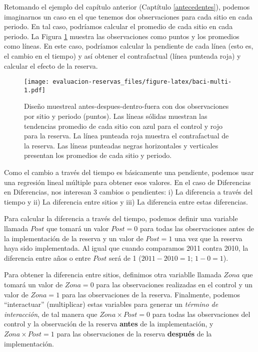 \documentclass[]{krantz}
\begin{document}
Retomando el ejemplo del capítulo anterior (Captítulo \ref{antecedentes}), podemos imaginarnos un caso en el que tenemos dos observaciones para cada sitio en cada periodo. En tal caso, podríamos calcular el promedio de cada sitio en cada periodo. La Figura \ref{fig:baci-multi} muestra las observaciones como puntos y los promedios como líneas. En este caso, podríamos calcular la pendiente de cada línea (esto es, el cambio en el tiempo) y así obtener el contrafactual (línea punteada roja) y calcular el efecto de la reserva.

\begin{figure}
\centering
\texttt{[image: evaluacion-reservas\_files/figure-latex/baci-multi-1.pdf]}
\caption{\label{fig:baci-multi}Diseño muestreal antes-despues-dentro-fuera con dos observaciones por sitio y periodo (puntos). Las líneas sólidas muestran las tendencias promedio de cada sitio con azul para el control y rojo para la reserva. La línea punteada roja muestra el contrafactual de la reserva. Las líneas punteadas negras horizontales y verticales presentan los promedios de cada sitio y periodo.}
\end{figure}

Como el cambio a través del tiempo es básicamente una pendiente, podemos usar una regresión lineal múltiple para obtener esos valores. En el caso de Diferencias en Diferencias, nos interesan 3 cambios o pendientes: i) La diferencia a través del tiempo y ii) La diferencia entre sitios y iii) La diferencia entre estas diferencias.

Para calcular la diferencia a través del tiempo, podemos definir una variable llamada \(Post\) que tomará un valor \(Post = 0\) para todas las observaciones antes de la implementación de la reserva y un valor de \(Post = 1\) una vez que la reserva haya sido implementada. Al igual que cuando comparamos 2011 contra 2010, la diferencia entre años o entre \(Post\) será de 1 (\(2011 - 2010 = 1\); \(1 - 0 = 1\)).

Para obtener la diferencia entre sitios, definimos otra variablle llamada \(Zona\) que tomará un valor de \(Zona = 0\) para las observaciones realizadas en el control y un valor de \(Zona = 1\) para las observaciones de la reserva. Finalmente, podemos ``interactuar'' (multiplicar) estas variables para generar un \emph{término de interacción}, de tal manera que \(Zona \times Post = 0\) para todas las observaciones del control y la observación de la reserva \textbf{antes} de la implementación, y \(Zona \times Post = 1\) para las observaciones de la reserva \textbf{después} de la implementación.
\end{document}
